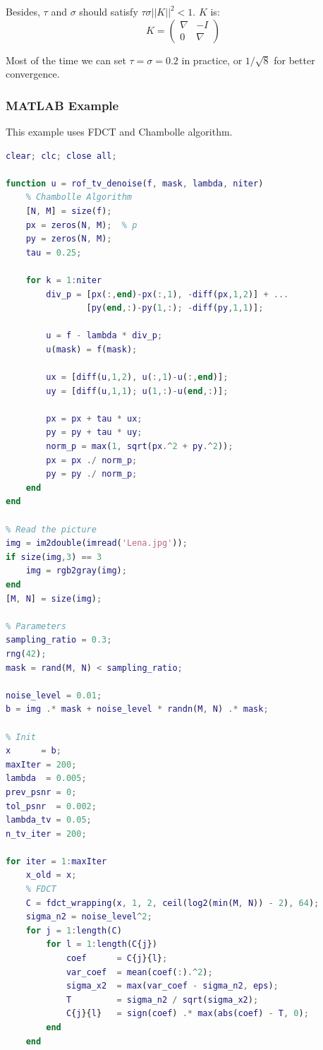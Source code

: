 \documentclass[12pt]{ctexart}
\begin{document}
Besides, $\tau$ and $\sigma$ should satisfy $\tau \sigma ||K||^2 < 1$. $K$ is:
\[
  K = \begin{pmatrix}
    \nabla & -I \\
    0 & \nabla
  \end{pmatrix}
\]

Most of the time we can set $\tau = \sigma = 0.2$ in practice, or $1/\sqrt{8}$
for better convergence.


\subsubsection{\textbf{MATLAB Example}}

This example uses FDCT and Chambolle algorithm.

\begin{lstlisting}[language=Matlab]
clear; clc; close all;

function u = rof_tv_denoise(f, mask, lambda, niter)
    % Chambolle Algorithm
    [N, M] = size(f);
    px = zeros(N, M);  % p
    py = zeros(N, M);
    tau = 0.25;

    for k = 1:niter
        div_p = [px(:,end)-px(:,1), -diff(px,1,2)] + ...
                [py(end,:)-py(1,:); -diff(py,1,1)];

        u = f - lambda * div_p;
        u(mask) = f(mask);

        ux = [diff(u,1,2), u(:,1)-u(:,end)];
        uy = [diff(u,1,1); u(1,:)-u(end,:)];

        px = px + tau * ux;
        py = py + tau * uy;
        norm_p = max(1, sqrt(px.^2 + py.^2));
        px = px ./ norm_p;
        py = py ./ norm_p;
    end
end

% Read the picture
img = im2double(imread('Lena.jpg'));
if size(img,3) == 3
    img = rgb2gray(img);
end
[M, N] = size(img);

% Parameters
sampling_ratio = 0.3;
rng(42);
mask = rand(M, N) < sampling_ratio;

noise_level = 0.01;
b = img .* mask + noise_level * randn(M, N) .* mask;

% Init
x      = b;
maxIter = 200;
lambda  = 0.005;
prev_psnr = 0;
tol_psnr  = 0.002;
lambda_tv = 0.05;
n_tv_iter = 200;

for iter = 1:maxIter
    x_old = x;
    % FDCT
    C = fdct_wrapping(x, 1, 2, ceil(log2(min(M, N)) - 2), 64);
    sigma_n2 = noise_level^2;
    for j = 1:length(C)
        for l = 1:length(C{j})
            coef      = C{j}{l};
            var_coef  = mean(coef(:).^2);
            sigma_x2  = max(var_coef - sigma_n2, eps);
            T         = sigma_n2 / sqrt(sigma_x2);
            C{j}{l}   = sign(coef) .* max(abs(coef) - T, 0);
        end
    end


\end{lstlisting}
\end{document}
